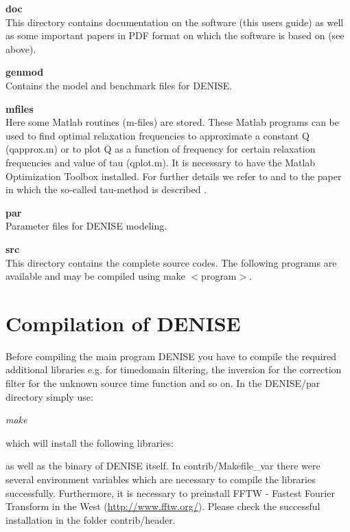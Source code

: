 \textbf{doc}\\
This directory contains documentation on the software (this users guide) as well as some important papers in PDF format on which the software is based on (see above).

\textbf{genmod}\\
Contains the model and benchmark files for DENISE.

\textbf{mfiles}\\
Here some Matlab routines (m-files) are stored. These Matlab programs can be used to find optimal relaxation frequencies to approximate a constant Q (qapprox.m) or to plot Q as a function of frequency for certain relaxation frequencies and value of tau (qplot.m). It is necessary to have the Matlab Optimization Toolbox installed. For further details we refer to \cite{bohlen:98} and to the paper in which the so-called tau-method is described \cite{blanch:95}.

\textbf{par}\\
Parameter files for DENISE modeling.


\textbf{src}\\
This directory contains the complete source codes.  The following programs are available and may be compiled using make $<$program$>$.


\section{Compilation of DENISE}\label{compexec}
Before compiling the main program DENISE you have to compile the required additional libraries e.g. for timedomain filtering, the inversion for the correction filter for the unknown source time function and so on. In the DENISE/par directory simply use:
\newline

\textit{make}
\newline

which will install the following libraries:

{\color{blue}{\begin{verbatim}
lib cseife
lib stfinv
lib aff
lib fourier
\end{verbatim}}}
as well as the binary of DENISE itself.
In contrib/Makefile\_var there were several environment variables which are necessary to compile the libraries successfully. Furthermore, it is necessary to preinstall FFTW - Fastest Fourier Transform in the West (\href{http://www.fftw.org/}{http://www.fftw.org/}). Please check the successful installation in the folder contrib/header.
\newline
  
